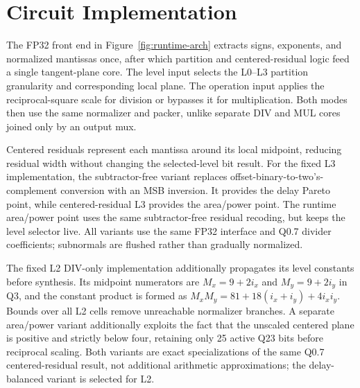 \documentclass[conference]{IEEEtran}
\begin{document}
\section{Circuit Implementation}
The FP32 front end in Figure~\ref{fig:runtime-arch}
extracts signs, exponents, and normalized mantissas once, after which partition
and centered-residual logic feed a single tangent-plane core. The level input
selects the L0--L3 partition granularity and corresponding local plane. The operation input applies the
reciprocal-square scale for division or bypasses it for multiplication. Both
modes then use the same normalizer and packer, unlike separate DIV and MUL
cores joined only by an output mux.

Centered residuals represent each mantissa around its local midpoint, reducing
residual width without changing the selected-level bit result. For the fixed
L3 implementation, the subtractor-free variant replaces
offset-binary-to-two's-complement conversion with an MSB inversion. It provides
the delay Pareto point, while centered-residual L3 provides the area/power
point. The runtime area/power point uses the same subtractor-free residual
recoding, but keeps the level selector live. All variants use the same FP32
interface and Q0.7 divider coefficients; subnormals are flushed rather than
gradually normalized.

The fixed L2 DIV-only implementation additionally propagates its level
constants before synthesis. Its midpoint numerators are
$M_x=9+2i_x$ and $M_y=9+2i_y$ in Q3, and the constant product is formed as
$M_xM_y=81+18(i_x+i_y)+4i_xi_y$. Bounds over all L2 cells remove unreachable
normalizer branches. A separate area/power variant additionally exploits the
fact that the unscaled centered plane is positive and strictly below four,
retaining only 25 active Q23 bits before reciprocal scaling. Both variants are
exact specializations of the same Q0.7 centered-residual result, not additional
arithmetic approximations; the delay-balanced variant is selected for L2.
\end{document}
